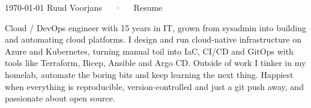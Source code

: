 \documentclass[11pt, a4paper]{awesome-cv}
\begin{document}
\makecvheader[C]

\makecvfooter
  {\today}
  {Ruud Voorjans~~~·~~~Resume}
  {\thepage}

\begin{cvparagraph}

Cloud / DevOps engineer with 15 years in IT, grown from sysadmin into building and automating cloud platforms. I design and run cloud-native infrastructure on Azure and Kubernetes, turning manual toil into IaC, CI/CD and GitOps with tools like Terraform, Bicep, Ansible and Argo CD. Outside of work I tinker in my homelab, automate the boring bits and keep learning the next thing. Happiest when everything is reproducible, version-controlled and just a git push away, and passionate about open source.


\end{cvparagraph}
\end{document}
